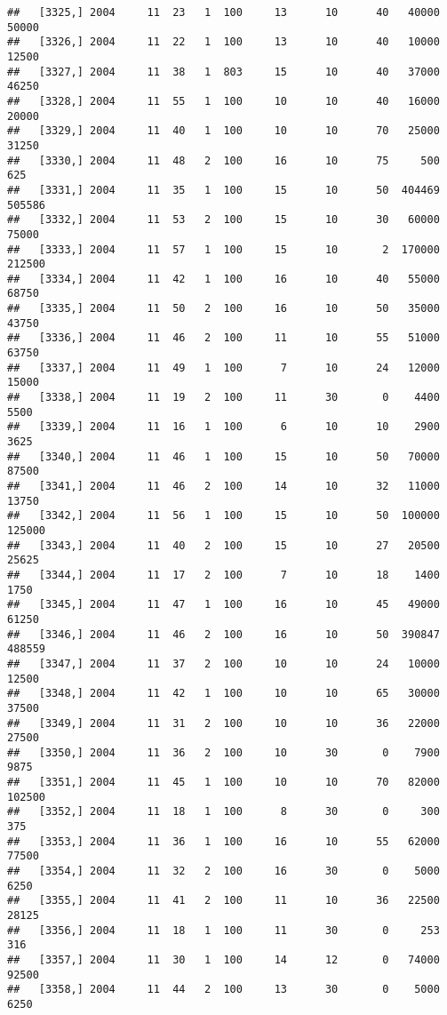 \documentclass{article}\usepackage[]{graphicx}\usepackage[]{color}
\makeatletter
\newenvironment{kframe}{%
 \def\at@end@of@kframe{}%
 \ifinner\ifhmode%
  \def\at@end@of@kframe{\end{minipage}}%
  \begin{minipage}{\columnwidth}%
 \fi\fi%
 \def\FrameCommand##1{\hskip\@totalleftmargin \hskip-\fboxsep
 \colorbox{shadecolor}{##1}\hskip-\fboxsep
     \hskip-\linewidth \hskip-\@totalleftmargin \hskip\columnwidth}%
 \MakeFramed {\advance\hsize-\width
   \@totalleftmargin\z@ \linewidth\hsize
   \@setminipage}}%
 {\par\unskip\endMakeFramed%
 \at@end@of@kframe}
\newenvironment{knitrout}{}{} %
\makeatother
\begin{document}
\begin{knitrout}
\begin{kframe}
\begin{verbatim}
##   [3325,] 2004     11  23   1  100     13      10      40   40000   50000
##   [3326,] 2004     11  22   1  100     13      10      40   10000   12500
##   [3327,] 2004     11  38   1  803     15      10      40   37000   46250
##   [3328,] 2004     11  55   1  100     10      10      40   16000   20000
##   [3329,] 2004     11  40   1  100     10      10      70   25000   31250
##   [3330,] 2004     11  48   2  100     16      10      75     500     625
##   [3331,] 2004     11  35   1  100     15      10      50  404469  505586
##   [3332,] 2004     11  53   2  100     15      10      30   60000   75000
##   [3333,] 2004     11  57   1  100     15      10       2  170000  212500
##   [3334,] 2004     11  42   1  100     16      10      40   55000   68750
##   [3335,] 2004     11  50   2  100     16      10      50   35000   43750
##   [3336,] 2004     11  46   2  100     11      10      55   51000   63750
##   [3337,] 2004     11  49   1  100      7      10      24   12000   15000
##   [3338,] 2004     11  19   2  100     11      30       0    4400    5500
##   [3339,] 2004     11  16   1  100      6      10      10    2900    3625
##   [3340,] 2004     11  46   1  100     15      10      50   70000   87500
##   [3341,] 2004     11  46   2  100     14      10      32   11000   13750
##   [3342,] 2004     11  56   1  100     15      10      50  100000  125000
##   [3343,] 2004     11  40   2  100     15      10      27   20500   25625
##   [3344,] 2004     11  17   2  100      7      10      18    1400    1750
##   [3345,] 2004     11  47   1  100     16      10      45   49000   61250
##   [3346,] 2004     11  46   2  100     16      10      50  390847  488559
##   [3347,] 2004     11  37   2  100     10      10      24   10000   12500
##   [3348,] 2004     11  42   1  100     10      10      65   30000   37500
##   [3349,] 2004     11  31   2  100     10      10      36   22000   27500
##   [3350,] 2004     11  36   2  100     10      30       0    7900    9875
##   [3351,] 2004     11  45   1  100     10      10      70   82000  102500
##   [3352,] 2004     11  18   1  100      8      30       0     300     375
##   [3353,] 2004     11  36   1  100     16      10      55   62000   77500
##   [3354,] 2004     11  32   2  100     16      30       0    5000    6250
##   [3355,] 2004     11  41   2  100     11      10      36   22500   28125
##   [3356,] 2004     11  18   1  100     11      30       0     253     316
##   [3357,] 2004     11  30   1  100     14      12       0   74000   92500
##   [3358,] 2004     11  44   2  100     13      30       0    5000    6250

\end{verbatim}
\end{kframe}
\end{knitrout}
\end{document}
